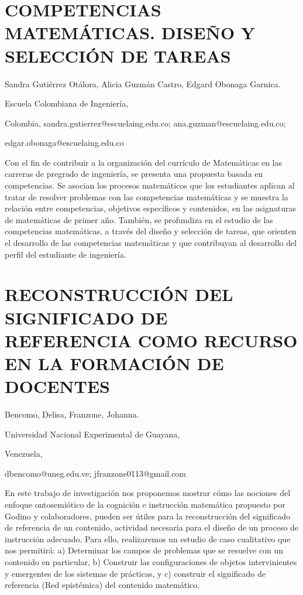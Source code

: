 \section{COMPETENCIAS MATEMÁTICAS. DISEÑO Y SELECCIÓN DE TAREAS}

\begin{datos}

Sandra Gutiérrez Otálora, Alicia Guzmán Castro, Edgard Obonaga Garnica.

Escuela Colombiana de Ingeniería,

Colombia, sandra.gutierrez@escuelaing.edu.co; ana.guzman@escuelaing.edu.co;

edgar.obonaga@escuelaing.edu.co 

\end{datos}

Con el fin de contribuir a la organización del currículo de Matemáticas
en las carreras de pregrado de ingeniería, se presenta una propuesta
basada en competencias. Se asocian los procesos matemáticos que los
estudiantes aplican al tratar de resolver problemas con las competencias
matemáticas y se muestra la relación entre competencias, objetivos
específicos y contenidos, en las asignaturas de matemáticas de primer
año. También, se profundiza en el estudio de las competencias matemáticas,
a través del diseño y selección de tareas, que orienten el desarrollo
de las competencias matemáticas y que contribuyan al desarrollo del
perfil del estudiante de ingeniería.


\section{RECONSTRUCCIÓN DEL SIGNIFICADO DE REFERENCIA COMO RECURSO EN LA FORMACIÓN
DE DOCENTES}

\begin{datos}

Bencomo, Delisa, Franzone, Johanna.

Universidad Nacional Experimental de Guayana,

Venezuela,

dbencomo@uneg.edu.ve; jfranzone0113@gmail.com 

\end{datos}

En este trabajo de investigación nos proponemos mostrar cómo las nociones
del enfoque ontosemiótico de la cognición e instrucción matemática
propuesto por Godino y colaboradores, pueden ser útiles para la reconstrucción
del significado de referencia de un contenido, actividad necesaria
para el diseño de un proceso de instrucción adecuado. Para ello, realizaremos
un estudio de caso cualitativo que nos permitirá: a) Determinar los
campos de problemas que se resuelve con un contenido en particular,
b) Construir las configuraciones de objetos intervinientes y emergentes
de los sistemas de prácticas, y c) construir el significado de referencia
(Red epistémica) del contenido matemático.


